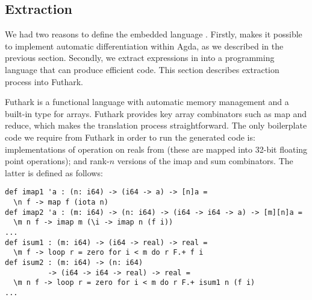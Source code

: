 % 
\subsection{Extraction}

We had two reasons to define the embedded language .
Firstly,  makes it possible to implement automatic differentiation
within Agda, as we described in the previous section.
Secondly, we extract expressions in  into
a programming language that can produce efficient code.  This
section describes extraction process into Futhark.

Futhark is a functional language with automatic memory management and
a built-in type for arrays.  Futhark provides key array combinators such as
map and reduce, which makes the translation process straightforward.
The only boilerplate code we require from Futhark in order
to run the generated code is: implementations of operation on reals
from  (these are mapped into 32-bit floating point operations);
and rank-$n$ versions of the imap and sum combinators.  The latter is defined
as follows:
\begin{Verbatim}
def imap1 'a : (n: i64) -> (i64 -> a) -> [n]a =
  \n f -> map f (iota n)
def imap2 'a : (m: i64) -> (n: i64) -> (i64 -> i64 -> a) -> [m][n]a =
  \m n f -> imap m (\i -> imap n (f i))
...
def isum1 : (m: i64) -> (i64 -> real) -> real =
  \m f -> loop r = zero for i < m do r F.+ f i
def isum2 : (m: i64) -> (n: i64)
          -> (i64 -> i64 -> real) -> real =
  \m n f -> loop r = zero for i < m do r F.+ isum1 n (f i)
...
\end{Verbatim}


